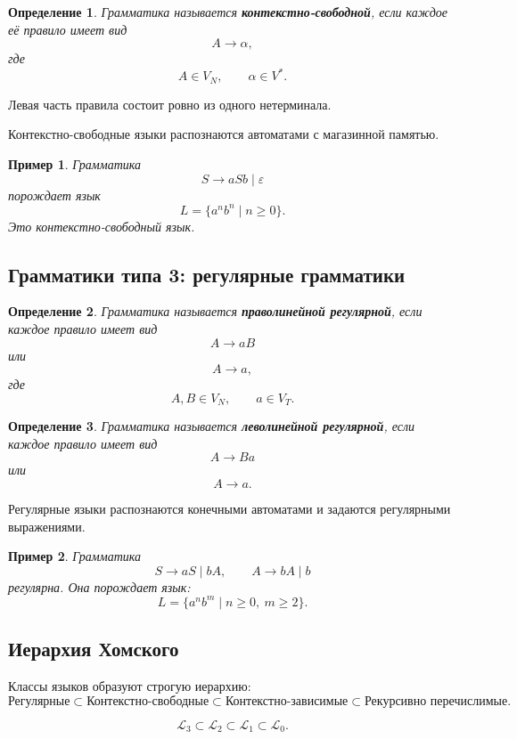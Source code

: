 \documentclass[12pt,a4paper]{article}
\newtheorem{definition}{Определение}
\newtheorem{example}{Пример}
\newcommand{\eps}{\varepsilon}
\begin{document}
\begin{definition}
Грамматика называется \textbf{контекстно-свободной}, если каждое её правило имеет вид
\[
A\to \alpha,
\]
где
\[
A\in V_N,\qquad \alpha\in V^*.
\]
\end{definition}

Левая часть правила состоит ровно из одного нетерминала.

Контекстно-свободные языки распознаются автоматами с магазинной памятью.

\begin{example}
Грамматика
\[
S\to aSb\mid \eps
\]
порождает язык
\[
L=\{a^n b^n\mid n\ge 0\}.
\]
Это контекстно-свободный язык.
\end{example}

\subsection{Грамматики типа 3: регулярные грамматики}

\begin{definition}
Грамматика называется \textbf{праволинейной регулярной}, если каждое правило имеет вид
\[
A\to aB
\]
или
\[
A\to a,
\]
где
\[
A,B\in V_N,\qquad a\in V_T.
\]
\end{definition}

\begin{definition}
Грамматика называется \textbf{леволинейной регулярной}, если каждое правило имеет вид
\[
A\to Ba
\]
или
\[
A\to a.
\]
\end{definition}

Регулярные языки распознаются конечными автоматами и задаются регулярными выражениями.

\begin{example}
Грамматика
\[
S\to aS\mid bA,\qquad A\to bA\mid b
\]
регулярна. Она порождает язык:
\[
L=\{a^n b^m\mid n\ge 0,\ m\ge 2\}.
\]
\end{example}

\subsection{Иерархия Хомского}

Классы языков образуют строгую иерархию:
\[
\text{Регулярные}
\subset
\text{Контекстно-свободные}
\subset
\text{Контекстно-зависимые}
\subset
\text{Рекурсивно перечислимые}.
\]

\[
\mathcal{L}_3\subset \mathcal{L}_2\subset \mathcal{L}_1\subset \mathcal{L}_0.
\]
\end{document}

